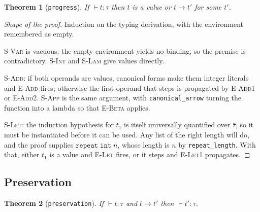 \documentclass[11pt,a4paper]{article}
\newtheorem{theorem}{Theorem}
\newcommand{\tint}{\mathtt{int}}
\newcommand{\step}{\longrightarrow}
\begin{document}
\begin{theorem}[\texttt{progress}]
  If $\vdash t : \tau$ then $t$ is a value or $t \step t'$ for some $t'$.
\end{theorem}

\begin{proof}[Shape of the proof]
Induction on the typing derivation, with the environment remembered as empty.

\textsc{S-Var} is vacuous: the empty environment yields no binding, so the
premise is contradictory.  \textsc{S-Int} and \textsc{S-Lam} give values
directly.

\textsc{S-Add}: if both operands are values, canonical forms make them integer
literals and \textsc{E-Add} fires; otherwise the first operand that steps is
propagated by \textsc{E-Add1} or \textsc{E-Add2}.  \textsc{S-App} is the same
argument, with \texttt{canonical\_arrow} turning the function into a lambda so
that \textsc{E-Beta} applies.

\textsc{S-Let}: the induction hypothesis for $t_1$ is itself universally
quantified over $\bar\tau$, so it must be instantiated before it can be used.
Any list of the right length will do, and the proof supplies
$\mathtt{repeat}\;\tint\;n$, whose length is $n$ by
\texttt{repeat\_length}.  With that, either $t_1$ is a value and
\textsc{E-Let} fires, or it steps and \textsc{E-Let1} propagates.
\end{proof}

\subsection{Preservation}

\begin{theorem}[\texttt{preservation}]
  If $\vdash t : \tau$ and $t \step t'$ then $\vdash t' : \tau$.
\end{theorem}
\end{document}
